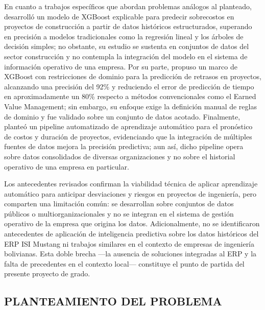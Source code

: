 \documentclass{univalle-perfil}
\begin{document}
En cuanto a trabajos específicos que abordan problemas análogos al planteado, \textcite{XGBoostCostOverrun2026} desarrolló un modelo de XGBoost explicable para predecir sobrecostos en proyectos de construcción a partir de datos históricos estructurados, superando en precisión a modelos tradicionales como la regresión lineal y los árboles de decisión simples; no obstante, su estudio se sustenta en conjuntos de datos del sector construcción y no contempla la integración del modelo en el sistema de información operativo de una empresa. Por su parte, \textcite{DomainAwareXGBoost2025} propuso un marco de XGBoost con restricciones de dominio para la predicción de retrasos en proyectos, alcanzando una precisión del 92\% y reduciendo el error de predicción de tiempo en aproximadamente un 80\% respecto a métodos convencionales como el Earned Value Management; sin embargo, su enfoque exige la definición manual de reglas de dominio y fue validado sobre un conjunto de datos acotado. Finalmente, \textcite{AutoMLpipeline2025} planteó un pipeline automatizado de aprendizaje automático para el pronóstico de costos y duración de proyectos, evidenciando que la integración de múltiples fuentes de datos mejora la precisión predictiva; aun así, dicho pipeline opera sobre datos consolidados de diversas organizaciones y no sobre el historial operativo de una empresa en particular.

Los antecedentes revisados confirman la viabilidad técnica de aplicar aprendizaje automático para anticipar desviaciones y riesgos en proyectos de ingeniería, pero comparten una limitación común: se desarrollan sobre conjuntos de datos públicos o multiorganizacionales y no se integran en el sistema de gestión operativo de la empresa que origina los datos. Adicionalmente, no se identificaron antecedentes de aplicación de inteligencia predictiva sobre los datos históricos del ERP ISI Mustang ni trabajos similares en el contexto de empresas de ingeniería bolivianas. Esta doble brecha —la ausencia de soluciones integradas al ERP y la falta de precedentes en el contexto local— constituye el punto de partida del presente proyecto de grado.

\subsection{PLANTEAMIENTO DEL PROBLEMA}
\end{document}
